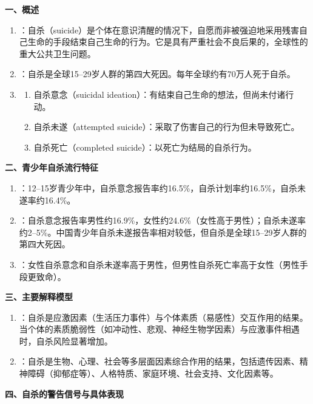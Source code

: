 \begin{keybox}
\textbf{一、概述}
\begin{enumerate}[leftmargin=*]
    \item {}：自杀（suicide）是个体在意识清醒的情况下，自愿而非被强迫地采用残害自己生命的手段结束自己生命的行为。它是具有严重社会不良后果的，全球性的重大公共卫生问题。
    \item {}：自杀是全球15--29岁人群的第四大死因。每年全球约有70万人死于自杀。
    \item {}
    \begin{enumerate}
        \item 自杀意念（suicidal ideation）：有结束自己生命的想法，但尚未付诸行动。
        \item 自杀未遂（attempted suicide）：采取了伤害自己的行为但未导致死亡。
        \item 自杀死亡（completed suicide）：以死亡为结局的自杀行为。
    \end{enumerate}
\end{enumerate}

\textbf{二、青少年自杀流行特征}
\begin{enumerate}[leftmargin=*]
    \item {}：12--15岁青少年中，自杀意念报告率约16.5\%，自杀计划率约16.5\%，自杀未遂率约16.4\%。
    \item {}：自杀意念报告率男性约16.9\%，女性约24.6\%（女性高于男性）；自杀未遂率约2--5\%。中国青少年自杀未遂报告率相对较低，但自杀是全球15--29岁人群的第四大死因。
    \item {}：女性自杀意念和自杀未遂率高于男性，但男性自杀死亡率高于女性（男性手段更致命）。
\end{enumerate}

\textbf{三、主要解释模型}
\begin{enumerate}[leftmargin=*]
    \item {}：自杀是应激因素（生活压力事件）与个体素质（易感性）交互作用的结果。当个体的素质脆弱性（如冲动性、悲观、神经生物学因素）与应激事件相遇时，自杀风险显著增加。

    \item {}：自杀是生物、心理、社会等多层面因素综合作用的结果，包括遗传因素、精神障碍（抑郁症等）、人格特质、家庭环境、社会支持、文化因素等。
\end{enumerate}

\textbf{四、自杀的警告信号与具体表现}


\end{keybox}
